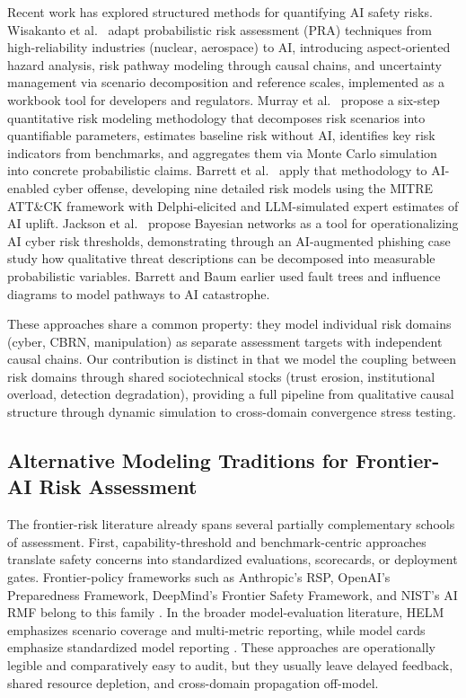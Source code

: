 \documentclass[11pt]{article}
\begin{document}
Recent work has explored structured methods for quantifying AI safety risks. Wisakanto et al.\ \citep{wisakanto2025adaptingprobabilisticriskassessment} adapt probabilistic risk assessment (PRA) techniques from high-reliability industries (nuclear, aerospace) to AI, introducing aspect-oriented hazard analysis, risk pathway modeling through causal chains, and uncertainty management via scenario decomposition and reference scales, implemented as a workbook tool for developers and regulators. Murray et al.\ \citep{murray2025methodologyquantitativeairisk} propose a six-step quantitative risk modeling methodology that decomposes risk scenarios into quantifiable parameters, estimates baseline risk without AI, identifies key risk indicators from benchmarks, and aggregates them via Monte Carlo simulation into concrete probabilistic claims. Barrett et al.\ \citep{barrett2025quantitativemodelingcybersecurityrisks} apply that methodology to AI-enabled cyber offense, developing nine detailed risk models using the MITRE ATT\&CK framework with Delphi-elicited and LLM-simulated expert estimates of AI uplift. Jackson et al.\ \citep{jackson2026riskthresholdsaienabledcyber} propose Bayesian networks as a tool for operationalizing AI cyber risk thresholds, demonstrating through an AI-augmented phishing case study how qualitative threat descriptions can be decomposed into measurable probabilistic variables. Barrett and Baum \citep{barrett2023} earlier used fault trees and influence diagrams to model pathways to AI catastrophe.

These approaches share a common property: they model individual risk domains (cyber, CBRN, manipulation) as separate assessment targets with independent causal chains. Our contribution is distinct in that we model the coupling between risk domains through shared sociotechnical stocks (trust erosion, institutional overload, detection degradation), providing a full pipeline from qualitative causal structure through dynamic simulation to cross-domain convergence stress testing.

\subsection{Alternative Modeling Traditions for Frontier-AI Risk Assessment}

The frontier-risk literature already spans several partially complementary schools of assessment. First, capability-threshold and benchmark-centric approaches translate safety concerns into standardized evaluations, scorecards, or deployment gates. Frontier-policy frameworks such as Anthropic's RSP, OpenAI's Preparedness Framework, DeepMind's Frontier Safety Framework, and NIST's AI RMF belong to this family \citep{anthropic2024rsp,openai2023preparedness,deepmind2024fsf,nist2023rmf}. In the broader model-evaluation literature, HELM emphasizes scenario coverage and multi-metric reporting, while model cards emphasize standardized model reporting \citep{liang2023helm,mitchell2019modelcards}. These approaches are operationally legible and comparatively easy to audit, but they usually leave delayed feedback, shared resource depletion, and cross-domain propagation off-model.
\end{document}
